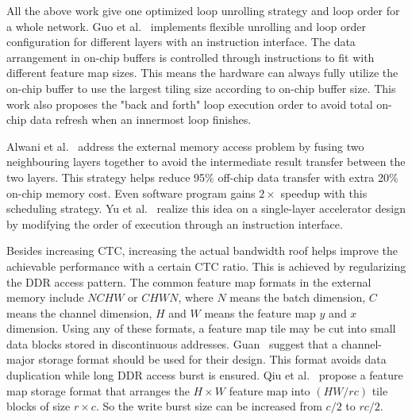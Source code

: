 All the above work give one optimized loop unrolling strategy and loop order for a whole network. Guo et al.~\cite{guo2017angel} implements flexible unrolling and loop order configuration for different layers with an instruction interface. The data arrangement in on-chip buffers is controlled through instructions to fit with different feature map sizes. This means the hardware can always fully utilize the on-chip buffer to use the largest tiling size according to on-chip buffer size. This work also proposes the "back and forth" loop execution order to avoid total on-chip data refresh when an innermost loop finishes.

Alwani et al.~\cite{alwani2016fused} address the external memory access problem by fusing two neighbouring layers together to avoid the intermediate result transfer between the two layers. This strategy helps reduce 95\% off-chip data transfer with extra 20\% on-chip memory cost. Even software program gains $2\times$ speedup with this scheduling strategy. Yu et al.~\cite{Yu2017Instruction} realize this idea on a single-layer accelerator design by modifying the order of execution through an instruction interface.

Besides increasing CTC, increasing the actual bandwidth roof helps improve the achievable performance with a certain CTC ratio. This is achieved by regularizing the DDR access pattern. The common feature map formats in the external memory include $NCHW$ or $CHWN$, where $N$ means the batch dimension, $C$ means the channel dimension, $H$ and $W$ means the feature map $y$ and $x$ dimension. Using any of these formats, a feature map tile may be cut into small data blocks stored in discontinuous addresses. Guan~\cite{guan2017fp} suggest that a channel-major storage format should be used for their design. This format avoids data duplication while long DDR access burst is ensured. Qiu et al.~\cite{qiu2016going} propose a feature map storage format that arranges the $H\times W$ feature map into $(HW/rc)$ tile blocks of size $r\times c$. So the write burst size can be increased from $c/2$ to $rc/2$.
